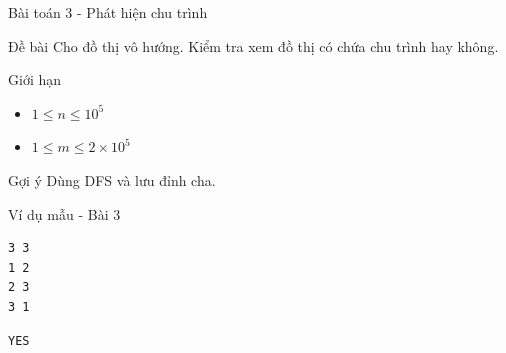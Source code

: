 \documentclass{beamer}
\begin{document}
\begin{frame}{Bài toán 3 - Phát hiện chu trình}

    \begin{block}{Đề bài}
        Cho đồ thị vô hướng.
        Kiểm tra xem đồ thị có chứa chu trình hay không.
    \end{block}

    \pause

    \begin{block}{Giới hạn}
        \begin{itemize}
            \item $1 \le n \le 10^5$
            \item $1 \le m \le 2 \times 10^5$
        \end{itemize}
    \end{block}

    \pause

    \begin{alertblock}{Gợi ý}
        Dùng DFS và lưu đỉnh cha.
    \end{alertblock}

\end{frame}

\begin{frame}[fragile]{Ví dụ mẫu - Bài 3}

    \begin{tcolorbox}[title=Input]
        \begin{verbatim}
3 3
1 2
2 3
3 1
\end{verbatim}
    \end{tcolorbox}

    \pause

    \begin{tcolorbox}[title=Output]
        \begin{verbatim}
YES
\end{verbatim}
    \end{tcolorbox}

\end{frame}
\end{document}
